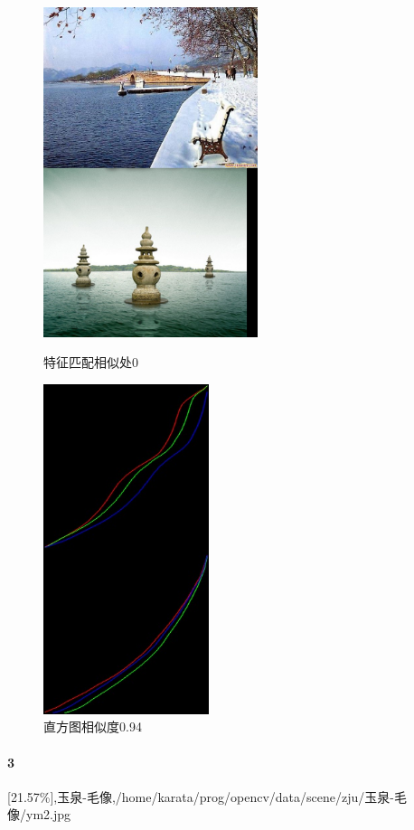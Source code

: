 \begin{figure}[htb]
\begin{minipage}[t]{0.5\linewidth}
\centering
\includegraphics[height=3.8in]{断桥.jpg.d/im2sift.jpg}
\caption{特征匹配相似处0}
\label{fig:side:a}
\end{minipage}%
\begin{minipage}[t]{0.5\linewidth}
\centering
\includegraphics[height=3.8in]{断桥.jpg.d/im2hist2.jpg}
\caption{直方图相似度0.94}
\label{fig:side:a}
\end{minipage}%
\end{figure}

\paragraph{3}
[21.57\%],玉泉-毛像,/home/karata/prog/opencv/data/scene/zju/玉泉-毛像/ym2.jpg

